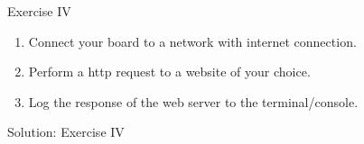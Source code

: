 \begin{frame}
    \begin{exampleblock}{Exercise IV}
        \begin{enumerate}
            \item Connect your board to a network with internet connection.
            \item Perform a \acs{http} request to a website of your choice.
            \item Log the response of the web server to the terminal/console.
        \end{enumerate}
    \end{exampleblock}
\end{frame}

\begin{frame}{Solution: Exercise IV}
\end{frame}